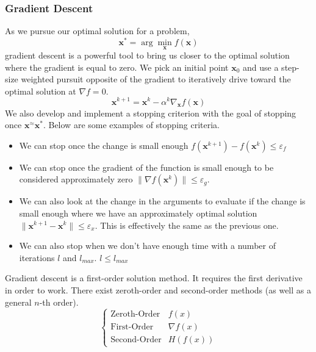 \documentclass[11pt]{article}
\begin{document}
\subsubsection{Gradient Descent}
As we pursue our optimal solution for a problem,
\begin{equation}
    \textbf{x}^* = \arg \min_{\textbf{x}} f(\textbf{x})
\end{equation}
gradient descent is a powerful tool to bring us closer to the optimal solution where the gradient is equal to zero.
We pick an initial point $\textbf{x}_0$ and use a step-size weighted pursuit opposite of the gradient to iteratively drive toward the optimal solution at $\nabla f= 0$.
\begin{equation}
    \textbf{x}^{k+1} = \textbf{x}^k - \alpha^k \nabla_{\textbf{x}} f(\textbf{x})
\end{equation}
We also develop and implement a stopping criterion with the goal of stopping once $\textbf{x}^ \approx \textbf{x}^*$.
Below are some examples of stopping criteria.
\begin{itemize}
    \item We can stop once the change is small enough $f(\textbf{x}^{k+1}) - f(\textbf{x}^k) \leq \varepsilon_f$
    \item We can stop once the gradient of the function is small enough to be considered approximately zero $ \| \nabla f(\textbf{x}^k) \|  \leq \varepsilon_g$.
    \item We can also look at the change in the arguments to evaluate if the change is small enough where we have an approximately optimal solution $ \| \textbf{x}^{k+1} - \textbf{x}^k \| \leq \varepsilon_x$. This is effectively the same as the previous one.
    \item We can also stop when we don't have enough time with a number of iterations $l$ and $l_{max}$. $l \leq l_{max}$
\end{itemize}

Gradient descent is a first-order solution method.
It requires the first derivative in order to work.
There exist zeroth-order and second-order methods (as well as a general $n$-th order).
\begin{equation}
    \begin{cases}
        \text{Zeroth-Order} & f(x) \\
        \text{First-Order} & \nabla f(x) \\
        \text{Second-Order} & H(f(x))
    \end{cases}
\end{equation}
\end{document}
